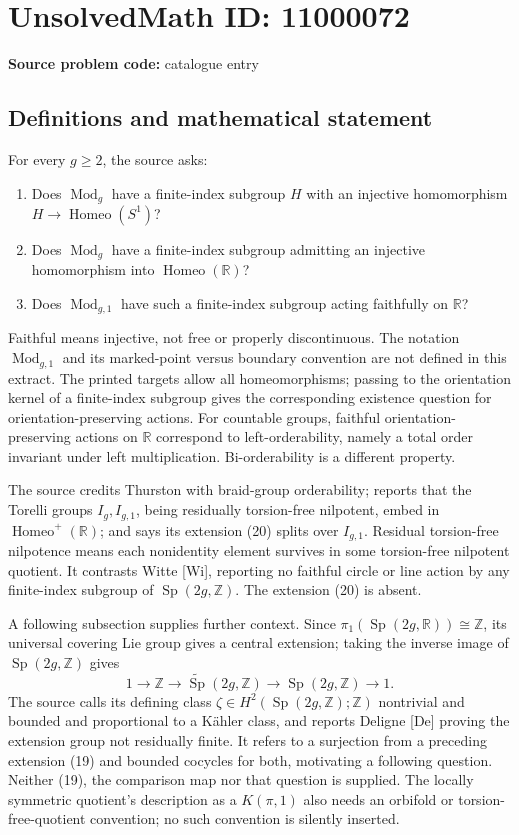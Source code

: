 \documentclass[11pt]{article}
\newcommand{\Z}{\mathbb{Z}}
\newcommand{\R}{\mathbb{R}}
\begin{document}
\section*{UnsolvedMath ID: 11000072}
\textbf{Source problem code:} catalogue entry
\subsection{Definitions and mathematical statement}
For every \(g\geq2\), the source asks:
\begin{enumerate}
\item Does \(\operatorname{Mod}_g\) have a finite-index subgroup \(H\) with an injective homomorphism \(H\to\operatorname{Homeo}(S^1)\)?
\item Does \(\operatorname{Mod}_g\) have a finite-index subgroup admitting an injective homomorphism into \(\operatorname{Homeo}(\R)\)?
\item Does \(\operatorname{Mod}_{g,1}\) have such a finite-index subgroup acting faithfully on \(\R\)?
\end{enumerate}
Faithful means injective, not free or properly discontinuous. The notation \(\operatorname{Mod}_{g,1}\) and its marked-point versus boundary convention are not defined in this extract. The printed targets allow all homeomorphisms; passing to the orientation kernel of a finite-index subgroup gives the corresponding existence question for orientation-preserving actions. For countable groups, faithful orientation-preserving actions on \(\R\) correspond to left-orderability, namely a total order invariant under left multiplication. Bi-orderability is a different property.

The source credits Thurston with braid-group orderability; reports that the Torelli groups \(I_g,I_{g,1}\), being residually torsion-free nilpotent, embed in \(\operatorname{Homeo}^+(\R)\); and says its extension (20) splits over \(I_{g,1}\). Residual torsion-free nilpotence means each nonidentity element survives in some torsion-free nilpotent quotient. It contrasts Witte [Wi], reporting no faithful circle or line action by any finite-index subgroup of \(\operatorname{Sp}(2g,\Z)\). The extension (20) is absent.

A following subsection supplies further context. Since \(\pi_1(\operatorname{Sp}(2g,\R))\cong\Z\), its universal covering Lie group gives a central extension; taking the inverse image of \(\operatorname{Sp}(2g,\Z)\) gives
\[
 1\longrightarrow\Z\longrightarrow
 \widetilde{\operatorname{Sp}}(2g,\Z)
 \longrightarrow\operatorname{Sp}(2g,\Z)\longrightarrow1.
\]
The source calls its defining class \(\zeta\in H^2(\operatorname{Sp}(2g,\Z);\Z)\) nontrivial and bounded and proportional to a K\"ahler class, and reports Deligne [De] proving the extension group not residually finite. It refers to a surjection from a preceding extension (19) and bounded cocycles for both, motivating a following question. Neither (19), the comparison map nor that question is supplied. The locally symmetric quotient's description as a \(K(\pi,1)\) also needs an orbifold or torsion-free-quotient convention; no such convention is silently inserted.
\end{document}
